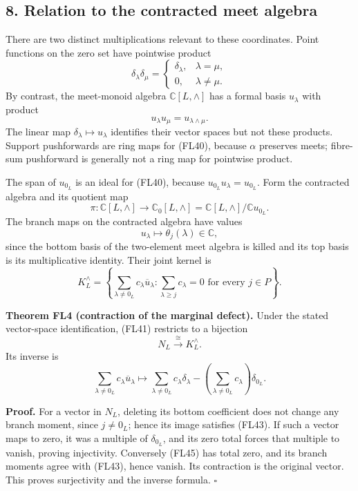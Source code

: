 \documentclass[
  10pt,
]{article}
\begin{document}
\subsection{8. Relation to the contracted meet
algebra}\label{relation-to-the-contracted-meet-algebra}

There are two distinct multiplications relevant to these coordinates.
Point functions on the zero set have pointwise product \[
\delta_\lambda\delta_\mu=
\begin{cases}\delta_\lambda,&\lambda=\mu,\\0,&\lambda\ne\mu.\end{cases}
\tag{FL39}
\] By contrast, the meet-monoid algebra \(\mathbb C[L,\wedge]\) has a
formal basis \(u_\lambda\) with product \[
u_\lambda u_\mu=u_{\lambda\wedge\mu}.
\tag{FL40}
\] The linear map \(\delta_\lambda\mapsto u_\lambda\) identifies their
vector spaces but not these products. Support pushforwards are ring maps
for (FL40), because \(\alpha\) preserves meets; fibre-sum pushforward is
generally not a ring map for pointwise product.

The span of \(u_{0_L}\) is an ideal for (FL40), because
\(u_{0_L}u_\lambda=u_{0_L}\). Form the contracted algebra and its
quotient map \[
\pi:\mathbb C[L,\wedge]\to
\mathbb C_0[L,\wedge]=\mathbb C[L,\wedge]/\mathbb C u_{0_L}.
\tag{FL41}
\] The branch maps on the contracted algebra have values \[
u_\lambda\longmapsto\theta_j(\lambda)\in\mathbb C,
\tag{FL42}
\] since the bottom basis of the two-element meet algebra is killed and
its top basis is its multiplicative identity. Their joint kernel is \[
K_L^{\wedge}=
\left\{\sum_{\lambda\ne0_L}c_\lambda\overline u_\lambda:
\sum_{\lambda\ge j}c_\lambda=0\text{ for every }j\in P\right\}.
\tag{FL43}
\]

\textbf{Theorem FL4 (contraction of the marginal defect).} Under the
stated vector-space identification, (FL41) restricts to a bijection \[
N_L\xrightarrow{\ \cong\ }K_L^{\wedge}.
\tag{FL44}
\] Its inverse is \[
\sum_{\lambda\ne0_L}c_\lambda\overline u_\lambda
\longmapsto
\sum_{\lambda\ne0_L}c_\lambda\delta_\lambda
-\left(\sum_{\lambda\ne0_L}c_\lambda\right)\delta_{0_L}.
\tag{FL45}
\]

\textbf{Proof.} For a vector in \(N_L\), deleting its bottom coefficient
does not change any branch moment, since \(j\ne0_L\); hence its image
satisfies (FL43). If such a vector maps to zero, it was a multiple of
\(\delta_{0_L}\), and its zero total forces that multiple to vanish,
proving injectivity. Conversely (FL45) has total zero, and its branch
moments agree with (FL43), hence vanish. Its contraction is the original
vector. This proves surjectivity and the inverse formula. \(\square\)
\end{document}
